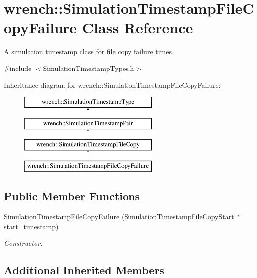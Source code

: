 \hypertarget{classwrench_1_1_simulation_timestamp_file_copy_failure}{}\section{wrench\+:\+:Simulation\+Timestamp\+File\+Copy\+Failure Class Reference}
\label{classwrench_1_1_simulation_timestamp_file_copy_failure}


A simulation timestamp class for file copy failure times.  




{\ttfamily \#include $<$Simulation\+Timestamp\+Types.\+h$>$}

Inheritance diagram for wrench\+:\+:Simulation\+Timestamp\+File\+Copy\+Failure\+:\begin{figure}[H]
\begin{center}
\leavevmode
\includegraphics[height=4.000000cm]{classwrench_1_1_simulation_timestamp_file_copy_failure}
\end{center}
\end{figure}
\subsection*{Public Member Functions}
\begin{DoxyCompactItemize}
\item 
\hyperlink{classwrench_1_1_simulation_timestamp_file_copy_failure_acf2a354bfb434b3780abd8f921cd8ef6}{Simulation\+Timestamp\+File\+Copy\+Failure} (\hyperlink{classwrench_1_1_simulation_timestamp_file_copy_start}{Simulation\+Timestamp\+File\+Copy\+Start} $\ast$start\+\_\+timestamp)
\begin{DoxyCompactList}\small\item\em Constructor. \end{DoxyCompactList}\end{DoxyCompactItemize}
\subsection*{Additional Inherited Members}


